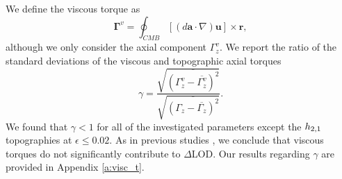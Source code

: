 We define the viscous torque as  
\[\mathbf{\Gamma}^{v} = \oint_{CMB} [(d\mathbf{a}\cdot\nabla) \mathbf{u} ]\times \mathbf{r},\]
although we only consider the axial component $\Gamma_{z}^{v}$. 
We report  the ratio of the standard deviations of the viscous and topographic axial torques
\[\gamma = \frac{\sqrt{\overline{(\Gamma_{z}^{v}-\overline{\Gamma_{z}^{v}})^{2}}}}{\sqrt{\overline{(\Gamma_{z}-\overline{\Gamma_{z}})^{2}}}}.\]
We found that $\gamma<1$ for all of the investigated parameters except the $h_{2,1}$ topographies at $\epsilon \leq0.02.$ As in previous studies \citep[e.g.][]{bB07}, we conclude that viscous torques do not significantly contribute to $\Delta$LOD. Our results regarding $\gamma$ are provided in Appendix \ref{a:visc_t}.

